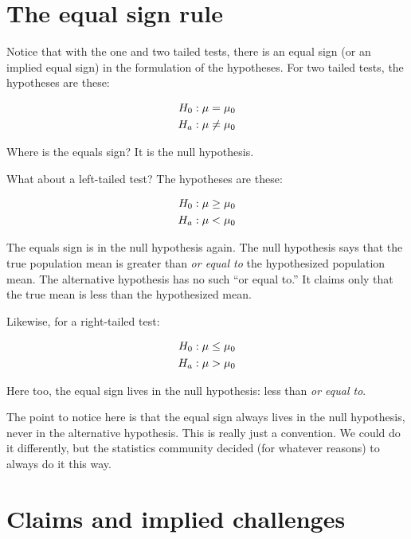 \documentclass[../../../main.tex]{subfiles}
\begin{document}
\section{The equal sign rule}

Notice that with the one and two tailed tests, there is an equal sign (or an implied equal sign) in the formulation of the hypotheses. For two tailed tests, the hypotheses are these:

\begin{align*}
  \NullHyp/: \populationmean = \HypPopMean/ \\
  \AltHyp/: \populationmean \not = \HypPopMean/
\end{align*}

\noindent
Where is the equals sign? It is the null hypothesis.

What about a left-tailed test? The hypotheses are these:

\begin{align*}
  \NullHyp/: \populationmean \geq \HypPopMean/ \\
  \AltHyp/: \populationmean < \HypPopMean/
\end{align*}

\noindent
The equals sign is in the null hypothesis again. The null hypothesis says that the true population mean is greater than \emph{or equal to} the hypothesized population mean. The alternative hypothesis has no such ``or equal to.'' It claims only that the true mean is less than the hypothesized mean.

Likewise, for a right-tailed test:

\begin{align*}
  \NullHyp/: \populationmean \leq \HypPopMean/ \\
  \AltHyp/: \populationmean > \HypPopMean/
\end{align*}

\noindent
Here too, the equal sign lives in the null hypothesis: less than \emph{or equal to}. 

The point to notice here is that the equal sign always lives in the null hypothesis, never in the alternative hypothesis. This is really just a convention. We could do it differently, but the statistics community decided (for whatever reasons) to always do it this way.


\section{Claims and implied challenges}
\end{document}
